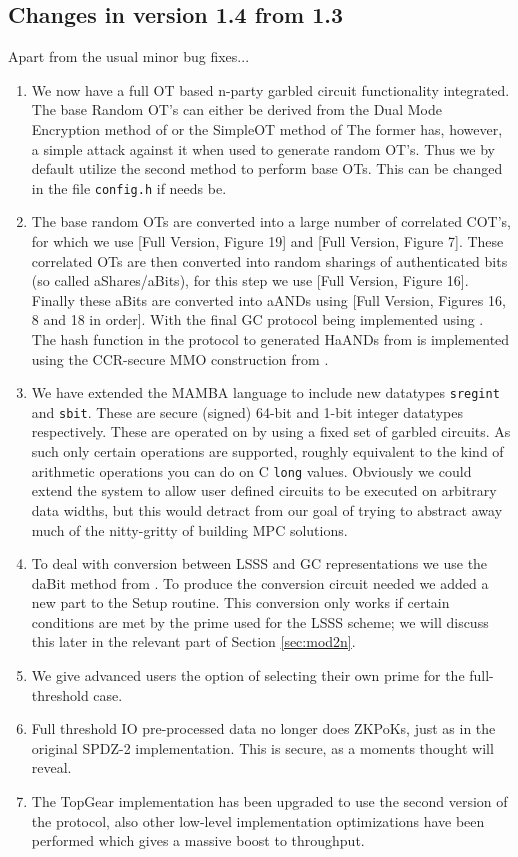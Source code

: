\subsection{Changes in version 1.4 from 1.3}
Apart from the usual minor bug fixes...
\begin{enumerate}
\item We now have a full OT based n-party garbled circuit functionality
integrated. The base Random OT's can either be
derived from the Dual Mode Encryption method of \cite{PVW08}
or the SimpleOT method of \cite{CO15}
The former has, however, a simple attack against it when used to
generate random OT's. Thus we by default utilize the 
second method to perform base OTs. This can be changed in
the file \verb+config.h+ if needs be.
\item The base random OTs are  converted into a large number of 
correlated COT's, for which we use \cite{AC:FKOS15}[Full Version, Figure 19] 
and \cite{C:KelOrsSch15}[Full Version, Figure 7].
These correlated OTs are then converted into random sharings of authenticated
bits (so called aShares/aBits), for this step we use \cite{AC:HazSchSor17}[Full Version, Figure 16].
Finally these aBits are converted into aANDs using 
\cite{CCS:WanRanKat17b}[Full Version, Figures 16, 8 and 18 in order].
With the final GC protocol being implemented using \cite{AC:HazSchSor17}.
The hash function in the protocol to generated HaANDs from \cite{CCS:WanRanKat17b}
is implemented using the CCR-secure MMO construction from \cite{GKWY19}.
\item We have extended the MAMBA language to include new datatypes
\verb+sregint+ and \verb+sbit+. These are secure (signed)
64-bit and 1-bit integer datatypes respectively. 
These are operated on by using a fixed
set of garbled circuits. As such only certain operations are supported,
roughly equivalent to the kind of arithmetic operations you can
do on C \verb+long+ values. Obviously we could extend the system to
allow user defined circuits to be executed on arbitrary data widths,
but this would detract from our goal of trying to abstract away
much of the nitty-gritty of building MPC solutions.
\item To deal with conversion between LSSS and GC representations
we use the daBit method from \cite{daBitPaper}.
To produce the conversion circuit needed we added a new part to the
Setup routine.
This conversion only works if certain conditions are met by the
prime used for the LSSS scheme; we will discuss this later
in the relevant part of Section \ref{sec:mod2n}.
\item We give advanced users the option of selecting their own
prime for the full-threshold case.
\item Full threshold IO pre-processed data no longer does ZKPoKs,
just as in the original SPDZ-2 implementation. This is secure,
as a moments thought will reveal.
\item The TopGear implementation has been upgraded to use the second 
version of the protocol, also other low-level implementation optimizations 
have been performed which gives a massive boost to throughput.
\end{enumerate}

